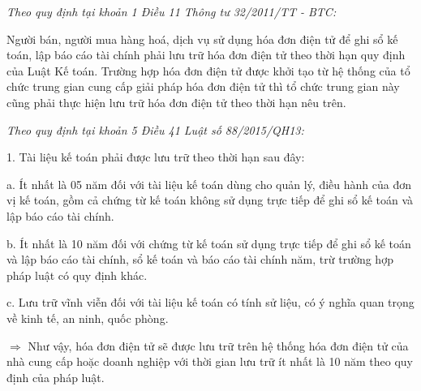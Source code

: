 \emph{Theo quy định tại khoản 1 Điều 11 Thông tư 32/2011/TT - BTC:}


Người bán, người mua hàng hoá, dịch vụ sử dụng hóa đơn điện tử để ghi sổ kế toán, lập báo cáo tài chính phải lưu trữ hóa đơn điện tử theo thời hạn quy định của Luật Kế toán. Trường hợp hóa đơn điện tử được khởi tạo từ hệ thống của tổ chức trung gian cung cấp giải pháp hóa đơn điện tử thì tổ chức trung gian này cũng phải thực hiện lưu trữ hóa đơn điện tử theo thời hạn nêu trên.


\emph{Theo quy định tại khoản 5 Điều 41 Luật số 88/2015/QH13:}


1. Tài liệu kế toán phải được lưu trữ theo thời hạn sau đây:

a. Ít nhất là 05 năm đối với tài liệu kế toán dùng cho quản lý, điều hành của đơn vị kế toán, gồm cả chứng từ kế toán không sử dụng trực tiếp để ghi sổ kế toán và lập báo cáo tài chính.

b. Ít nhất là 10 năm đối với chứng từ kế toán sử dụng trực tiếp để ghi sổ kế toán và lập báo cáo tài chính, sổ kế toán và báo cáo tài chính năm, trừ trường hợp pháp luật có quy định khác.

c. Lưu trữ vĩnh viễn đối với tài liệu kế toán có tính sử liệu, có ý nghĩa quan trọng về kinh tế, an ninh, quốc phòng.



$\Rightarrow$ Như vậy, hóa đơn điện tử sẽ được lưu trữ trên hệ thống hóa đơn điện tử của nhà cung cấp hoặc doanh nghiệp với thời gian lưu trữ ít nhất là 10 năm theo quy định của pháp luật.

